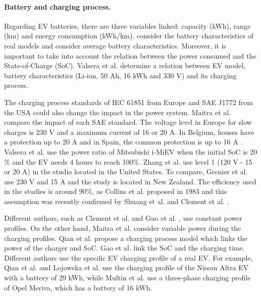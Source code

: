 \documentclass[a4paper,11pt,twoside,openright]{report}
\begin{document}
\paragraph{Battery and charging process.}

Regarding EV batteries, there are three variables linked: capacity (kWh), range (km) and energy consumption (kWh/km). \cite{Druitt2012,Tomic2007} consider the battery characteristics of real models and \cite{Loisel2014,Waraich2013,Metz2012,Lopez2013} consider average battery characteristics. Moreover, it is important to take into account the relation between the power consumed and the State-of-Charge (SoC). Valsera et al. \cite{Valsera2011} determine a relation between EV model, battery characteristics (Li-ion, 50 Ah, 16 kWh and 330 V) and its charging process. 

The charging process standards of IEC 61851 \cite{IEC61851-1} from Europe and SAE J1772 \cite{SAEJ1772} from the USA could also change the impact in the power system. Maitra et al. \cite{MaitraCIRED2009} compare the impact of each SAE standard. The voltage level in Europe for slow charges is 230 V and a maximum current of 16 or 20 A. In Belgium, houses have a protection up to 20 A \cite{Geth} and in Spain, the common protection is up to 16 A \cite{Valsera2011}. Valsera et al. use the power ratio of Mitsubishi i-MiEV when the initial SoC is 20$\%$ and the EV needs 4 hours to reach 100$\%$. Zhang et al. \cite{Zhang2011} use level 1 (120 V - 15 or 20 A) in the studio located in the United States. To compare, Grenier et al. \cite{GrenierNewZeland} use 230 V and 15 A and the study is located in New Zealand. The efficiency used in the studies is around 90$\%$, as Collins et al. proposed \cite{Collins1983} in 1983 and this assumption was recently confirmed by Shuang et al. \cite{Chan2011} and Clement et al. \cite{Clement2010,Clement2011}.

Different authors, such as Clement et al. \cite{Clement2010} and Guo et al. \cite{FactorAnalysisQinglai}, use constant power profiles. On the other hand, Maitra et al. \cite{MaitraCIRED2009} consider variable power during the charging profiles. Qian et al. \cite{Qian2011Modeling} propose a charging process model which links the power of the charger and SoC.  Gao et al. \cite{Chan2011_2} link the SoC and the charging time. Different authors use the specific EV charging profile of a real EV. For example, Qian et al. \cite{Qian2011Modeling} and Lojowska et al. \cite{Lojowska2011} use the charging profile of the Nissan Altra EV with a battery of 29 kWh, while Multin et al. \cite{Multin2012} use a three-phase charging profile of Opel Meriva, which has a battery of 16 kWh.
\end{document}
